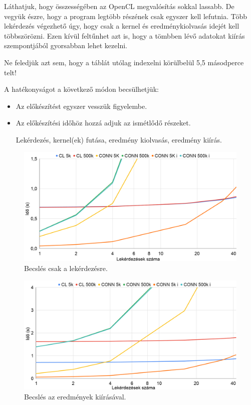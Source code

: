 Láthatjuk, hogy összességében az OpenCL megvalósítás sokkal lassabb. De vegyük észre, hogy a program legtöbb részének csak egyszer kell lefutnia. 
Több lekérdezés végezhető úgy, hogy csak a  kernel és eredménykiolvasás idejét kell többszörözni. Ezen kívül feltűnhet azt is, hogy a tömbben lévő adatokat kiírás szempontjából gyorsabban lehet kezelni.

Ne feledjük azt sem, hogy a táblát utólag indexelni körülbelül 5,5 másodperce telt!

A hatékonyságot a következő módon becsülhetjük:
\begin{itemize}
\item Az előkészítést egyszer vesszük figyelembe.
\item Az előkészítési időhöz hozzá adjuk az ismétlődő részeket.

Lekérdezés, kernel(ek) futása, eredmény kiolvasás, eredmény kiírás.

\end{itemize}

\begin{figure}[h!]
\centering
\includegraphics[width=\textwidth]{images/test/where.png}
\caption{Becslés csak a lekérdezésre.}
\label{fig:schema}
\end{figure}

\begin{figure}[h!]
\centering
\includegraphics[width=\textwidth]{images/test/where_write.png}
\caption{Becslés az eredmények kiírásával.}
\label{fig:schema}
\end{figure}

